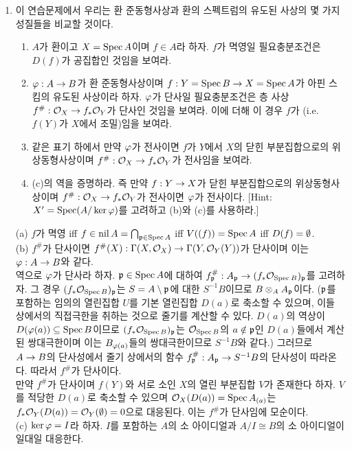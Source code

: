 \begin{enumerate}[label=\tb{2.\arabic*.},itemindent=0mm,itemsep=4mm]
	\item 이 연습문제에서 우리는 환 준동형사상과 환의 스펙트럼의 유도된 사상의 몇 가지 성질들을 비교할 것이다.
	\begin{enumerate}[label=(\alph*)]
	\item $A$가 환이고 $X=\operatorname{Spec} A$이며 $f\in A$라 하자. $f$가 멱영일 필요충분조건은 $D(f)$가 공집합인 것임을 보여라.
	\item $\varphi:A\rightarrow B$가 환 준동형사상이며 $f:Y=\operatorname{Spec} B\rightarrow X=\operatorname{Spec} A$가 아핀 스킴의 유도된 사상이라 하자.
	$\varphi$가 단사일 필요충분조건은 층 사상 $f^\#:\mathcal{O}_X\rightarrow f_*\mathcal{O}_Y$가 단사인 것임을 보여라.
	이에 더해 이 경우 $f$가 (i.e. $f(Y)$가 $X$에서 조밀)임을 보여라.
	\item 같은 표기 하에서 만약 $\varphi$가 전사이면 $f$가 $Y$에서 $X$의 닫힌 부분집합으로의 위상동형사상이며
	$f^\#:\mathcal{O}_X\rightarrow f_*\mathcal{O}_Y$가 전사임을 보여라.
	\item (c)의 역을 증명하라. 즉 만약 $f:Y\rightarrow X$가 닫힌 부분집합으로의 위상동형사상이며 $f^\#:\mathcal{O}_X\rightarrow f_*\mathcal{O}_Y$가 전사이면
	$\varphi$가 전사이다. [Hint: $X'=\operatorname{Spec}(A/\ker\varphi)$를 고려하고 (b)와 (c)를 사용하라.]
	\end{enumerate}
	\sol (a) $f$가 멱영 iff $f\in\operatorname{nil} A=\bigcap_{\mathfrak{p}\in\operatorname{Spec} A}$ iff $V((f))=\operatorname{Spec} A$ iff $D(f)=\emptyset$.\\
	(b) $f^\#$가 단사이면 $f^\#(X):\Gamma(X,\mathcal{O}_X)\rightarrow\Gamma(Y,\mathcal{O}_Y(Y))$가 단사이며 이는 $\varphi:A\rightarrow B$와 같다.\\
	역으로 $\varphi$가 단사라 하자. $\mathfrak{p}\in\operatorname{Spec} A$에 대하여 $f_{\mathfrak{p}}^\#:A_{\mathfrak{p}}\rightarrow(f_*\mathcal{O}_{\operatorname{Spec} B})_{\mathfrak{p}}$를 고려하자.
	그 경우 $(f_*\mathcal{O}_{\operatorname{Spec} B})_{\mathfrak{p}}$는 $S=A\setminus\mathfrak{p}$에 대한 $S^{-1}B$이므로 $B\otimes_AA_{\mathfrak{p}}$이다.
	($\mathfrak{p}$를 포함하는 임의의 열린집합 $U$를 기본 열린집합 $D(a)$로 축소할 수 있으며,
	이들 상에서의 직접극한을 취하는 것으로 줄기를 계산할 수 있다.
	$D(a)$의 역상이 $D(\varphi(a))\subseteq\operatorname{Spec} B$이므로 $(f_*\mathcal{O}_{\operatorname{Spec} B})_{\mathfrak{p}}$는 $\mathcal{O}_{\operatorname{Spec} B}$의
	$a\notin\mathfrak{p}$인 $D(a)$들에서 계산된 쌍대극한이며 이는 $B_{\varphi(a)}$들의 쌍대극한이므로 $S^{-1}B$와 같다.)
	그러므로 $A\rightarrow B$의 단사성에서 줄기 상에서의 함수 $f^\#_{\mathfrak{p}}:A_{\mathfrak{p}}\rightarrow S^{-1}B$의 단사성이 따라온다.
	따라서 $f^\#$가 단사이다.\\
	만약 $f^\#$가 단사이며 $f(Y)$와 서로 소인 $X$의 열린 부분집합 $V$가 존재한다 하자.
	$V$를 적당한 $D(a)$로 축소할 수 있으며 $\mathcal{O}_X(D(a))=\operatorname{Spec} A_{(a)}$는 $f_*\mathcal{O}_Y(D(a))=\mathcal{O}_Y(\emptyset)=0$으로 대응된다.
	이는 $f^\#$가 단사임에 모순이다.\\
	(c) $\ker\varphi=I$라 하자. $I$를 포함하는 $A$의 소 아이디얼과 $A/I\cong B$의 소 아이디얼이 일대일 대응한다.

\end{enumerate}
